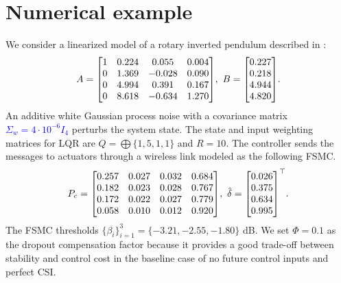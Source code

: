 \documentclass[journal,twoside,web]{ieeecolor}
\begin{document}
\section{Numerical example}\label{sec:example}
We consider a linearized model of a rotary inverted pendulum described in \cite{yZL-2025-automatica}:
\begin{equation*}%
A = \text{\small $
\begin{bmatrix}
1 & 0.224 & 0.055 & 0.004 \\
0 & 1.369 & -0.028 & 0.090 \\
0 & 4.994 & 0.391 & 0.167 \\
0 & 8.618 & -0.634 & 1.270
\end{bmatrix}$},~
B = \text{\small $
\begin{bmatrix}
0.227 \\
0.218 \\
4.944 \\
4.820 
\end{bmatrix}
$}.
\end{equation*}
An additive white Gaussian process noise with a covariance matrix \textcolor{blue}{$\Sigma_w \!=\! 4\cdot 10^{-6} I_4$} perturbs the system state. 
The state and input weighting matrices for LQR are $Q = \bigoplus\{1,5,1,1\}$ and $R = 10$.
The controller sends the messages to actuators through a wireless link modeled as the following FSMC.
\begin{equation*}%
P_c = \text{\small $
\begin{bmatrix}
0.257 & 0.027 & 0.032 & 0.684 \\
0.182 & 0.023 & 0.028 & 0.767 \\
0.172 & 0.022 & 0.027 & 0.779 \\
0.058 & 0.010 & 0.012 & 0.920
\end{bmatrix}$},~
\hat{\delta} = \text{\small $
\begin{bmatrix}
0.026 \\ 0.375 \\ 0.634 \\ 0.995
\end{bmatrix}^{\top}$}.
\end{equation*}
The FSMC thresholds $\{\beta_i\}_{i=1}^{3} = \{-3.21,-2.55,-1.80\}$ dB.
We set $\mathit{\Phi}=0.1$ as the dropout compensation factor because it provides a good trade-off between stability and control cost in the baseline case of no future control inputs and perfect CSI.
\end{document}
